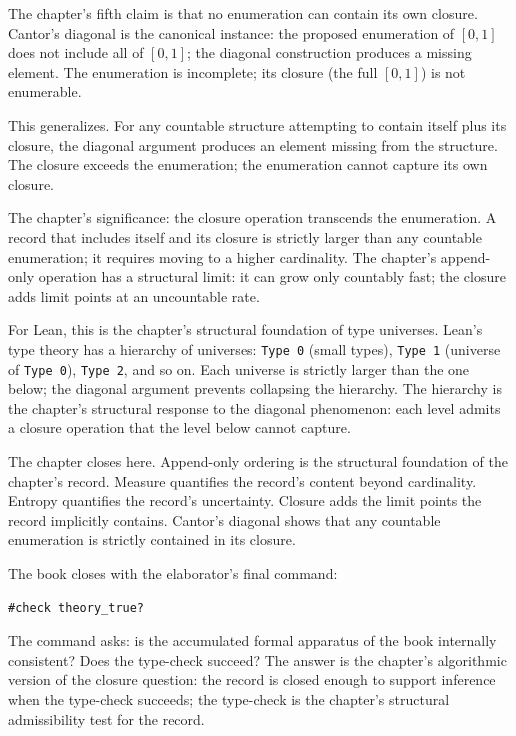 The chapter's fifth claim is that no enumeration can contain its
own closure. Cantor's diagonal is the canonical instance: the
proposed enumeration of $[0, 1]$ does not include all of $[0,
1]$; the diagonal construction produces a missing element. The
enumeration is incomplete; its closure (the full $[0, 1]$) is
not enumerable.

This generalizes. For any countable structure attempting to
contain itself plus its closure, the diagonal argument produces
an element missing from the structure. The closure exceeds the
enumeration; the enumeration cannot capture its own closure.

The chapter's significance: the closure operation transcends the
enumeration. A record that includes itself and its closure is
strictly larger than any countable enumeration; it requires
moving to a higher cardinality. The chapter's append-only
operation has a structural limit: it can grow only countably
fast; the closure adds limit points at an uncountable rate.

For Lean, this is the chapter's structural foundation of type
universes. Lean's type theory has a hierarchy of universes:
\texttt{Type 0} (small types), \texttt{Type 1} (universe of
\texttt{Type 0}), \texttt{Type 2}, and so on. Each universe is
strictly larger than the one below; the diagonal argument
prevents collapsing the hierarchy. The hierarchy is the chapter's
structural response to the diagonal phenomenon: each level admits
a closure operation that the level below cannot capture.

The chapter closes here. Append-only ordering is the structural
foundation of the chapter's record. Measure quantifies the
record's content beyond cardinality. Entropy quantifies the
record's uncertainty. Closure adds the limit points the record
implicitly contains. Cantor's diagonal shows that any countable
enumeration is strictly contained in its closure.

The book closes with the elaborator's final command:

\begin{verbatim}
#check theory_true?
\end{verbatim}

The command asks: is the accumulated formal apparatus of the book
internally consistent? Does the type-check succeed? The answer
is the chapter's algorithmic version of the closure question:
the record is closed enough to support inference when the
type-check succeeds; the type-check is the chapter's structural
admissibility test for the record.

